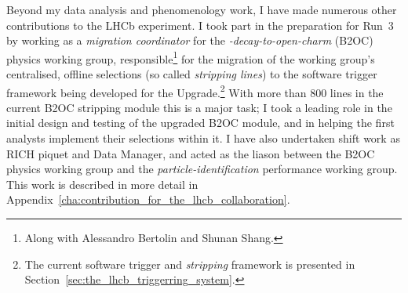 Beyond my data analysis and phenomenology work, I have made numerous other contributions to the LHCb experiment. I took part in the preparation for Run~3 by working as a \emph{migration coordinator} for the \emph{\B-decay-to-open-charm} (B2OC) physics working group, responsible\footnote{Along with Alessandro Bertolin and Shunan Shang.} for the migration of the working group's centralised, offline selections (so called \emph{stripping lines}) to the software trigger framework being developed for the \lhcb Upgrade.\footnote{The current software trigger and \emph{stripping} framework is presented in Section~\ref{sec:the_lhcb_triggerring_system}.} With more than 800 lines in the current B2OC stripping module this is a major task; I took a leading role in the initial design and testing of the upgraded B2OC module, and in helping the first analysts implement their selections within it. I have also undertaken shift work as RICH piquet and Data Manager, and acted as the liason between the B2OC physics working group and the \emph{particle-identification} performance working group. This work is described in more detail in Appendix~\ref{cha:contribution_for_the_lhcb_collaboration}.



